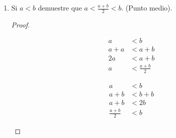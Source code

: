 \documentclass[11pt]{article}
\begin{document}
\begin{enumerate}[label=\alph*)]

    \item Si $a<b$ demuestre que $a<\frac{a+b}{2}<b$. (Punto medio).
    
    \vspace{-1em}\begin{proof} \leavevmode \vspace{-1em}
        \begin{center}
        \begin{minipage}[t]{.3\linewidth}
        \begin{align*}
        a &< b \\
        a + a &< a+b \\
        2a &< a+b \\
        a &< \frac{a+b}{2}
        \end{align*}
        \end{minipage}%
        \begin{minipage}[t]{.3\linewidth}
        \begin{align*}
        a &< b \\
        a + b &< b+b \\
        a +b &< 2b \\
        \frac{a+b}{2} &< b
        \end{align*} \qedhere
        \end{minipage}%
        \end{center}%
    \end{proof} \vspace{-1em}


\end{enumerate}
\end{document}
